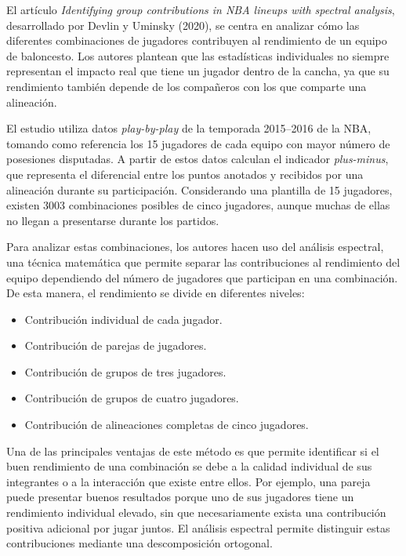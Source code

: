 El artículo \textit{Identifying group contributions in NBA lineups with spectral analysis}, desarrollado por Devlin y Uminsky (2020), se centra en analizar cómo las diferentes combinaciones de jugadores contribuyen al rendimiento de un equipo de baloncesto. Los autores plantean que las estadísticas individuales no siempre representan el impacto real que tiene un jugador dentro de la cancha, ya que su rendimiento también depende de los compañeros con los que comparte una alineación.

El estudio utiliza datos \textit{play-by-play} de la temporada 2015--2016 de la NBA, tomando como referencia los 15 jugadores de cada equipo con mayor número de posesiones disputadas. A partir de estos datos calculan el indicador \textit{plus-minus}, que representa el diferencial entre los puntos anotados y recibidos por una alineación durante su participación. Considerando una plantilla de 15 jugadores, existen 3003 combinaciones posibles de cinco jugadores, aunque muchas de ellas no llegan a presentarse durante los partidos.

Para analizar estas combinaciones, los autores hacen uso del análisis espectral, una técnica matemática que permite separar las contribuciones al rendimiento del equipo dependiendo del número de jugadores que participan en una combinación. De esta manera, el rendimiento se divide en diferentes niveles:

\begin{itemize}
    \item Contribución individual de cada jugador.
    \item Contribución de parejas de jugadores.
    \item Contribución de grupos de tres jugadores.
    \item Contribución de grupos de cuatro jugadores.
    \item Contribución de alineaciones completas de cinco jugadores.
\end{itemize}

Una de las principales ventajas de este método es que permite identificar si el buen rendimiento de una combinación se debe a la calidad individual de sus integrantes o a la interacción que existe entre ellos. Por ejemplo, una pareja puede presentar buenos resultados porque uno de sus jugadores tiene un rendimiento individual elevado, sin que necesariamente exista una contribución positiva adicional por jugar juntos. El análisis espectral permite distinguir estas contribuciones mediante una descomposición ortogonal.

